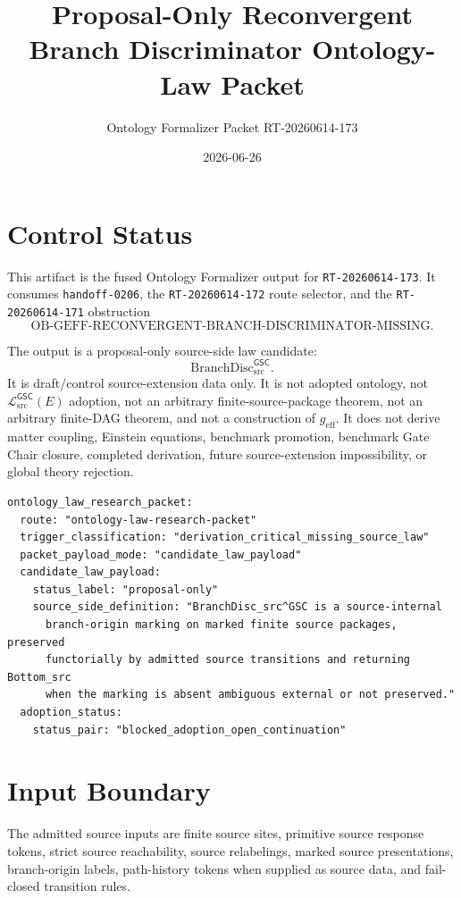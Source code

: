\documentclass[11pt]{article}
\title{Proposal-Only Reconvergent Branch Discriminator Ontology-Law Packet}
\author{Ontology Formalizer Packet RT-20260614-173}
\date{2026-06-26}
\newcommand{\MetricData}{\mathcal{L}_{\mathrm{src}}^{\mathsf{GSC}}}
\newcommand{\geff}{g_{\mathrm{eff}}}
\newcommand{\BranchDisc}{\mathrm{BranchDisc}_{\mathrm{src}}^{\mathsf{GSC}}}
\begin{document}
\maketitle

\section{Control Status}

This artifact is the fused Ontology Formalizer output for
\texttt{RT-20260614-173}. It consumes \texttt{handoff-0206}, the
\texttt{RT-20260614-172} route selector, and the
\texttt{RT-20260614-171} obstruction
\[
\mathrm{OB\mbox{-}GEFF\mbox{-}RECONVERGENT\mbox{-}BRANCH\mbox{-}DISCRIMINATOR\mbox{-}MISSING}.
\]

The output is a proposal-only source-side law candidate:
\[
  \BranchDisc.
\]
It is draft/control source-extension data only. It is not adopted ontology, not
\(\MetricData(E)\) adoption, not an arbitrary finite-source-package theorem,
not an arbitrary finite-DAG theorem, and not a construction of \(\geff\). It
does not derive matter coupling, Einstein equations, benchmark promotion,
benchmark Gate Chair closure, completed derivation, future source-extension
impossibility, or global theory rejection.

\begin{verbatim}
ontology_law_research_packet:
  route: "ontology-law-research-packet"
  trigger_classification: "derivation_critical_missing_source_law"
  packet_payload_mode: "candidate_law_payload"
  candidate_law_payload:
    status_label: "proposal-only"
    source_side_definition: "BranchDisc_src^GSC is a source-internal
      branch-origin marking on marked finite source packages, preserved
      functorially by admitted source transitions and returning Bottom_src
      when the marking is absent ambiguous external or not preserved."
  adoption_status:
    status_pair: "blocked_adoption_open_continuation"
\end{verbatim}

\section{Input Boundary}

The admitted source inputs are finite source sites, primitive source response
tokens, strict source reachability, source relabelings, marked source
presentations, branch-origin labels, path-history tokens when supplied as
source data, and fail-closed transition rules.
\end{document}
